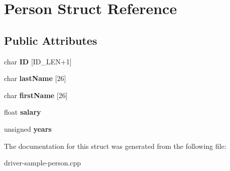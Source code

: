 \hypertarget{struct_person}{\section{Person Struct Reference}
\label{struct_person}
}
\subsection*{Public Attributes}
\begin{DoxyCompactItemize}
\item 
\hypertarget{struct_person_ac13050a60ce356457fa357108931b0d4}{char {\bfseries I\-D} \mbox{[}I\-D\-\_\-\-L\-E\-N+1\mbox{]}}\label{struct_person_ac13050a60ce356457fa357108931b0d4}

\item 
\hypertarget{struct_person_a3c2f907b30cfa4c8e7a4d52602087985}{char {\bfseries last\-Name} \mbox{[}26\mbox{]}}\label{struct_person_a3c2f907b30cfa4c8e7a4d52602087985}

\item 
\hypertarget{struct_person_a818747412f358878f6517472c587e5ac}{char {\bfseries first\-Name} \mbox{[}26\mbox{]}}\label{struct_person_a818747412f358878f6517472c587e5ac}

\item 
\hypertarget{struct_person_ab993b9296f5e833ecd1cfba33666759a}{float {\bfseries salary}}\label{struct_person_ab993b9296f5e833ecd1cfba33666759a}

\item 
\hypertarget{struct_person_a8bd7ca758a3b81e17f56c6fb87804c01}{unsigned {\bfseries years}}\label{struct_person_a8bd7ca758a3b81e17f56c6fb87804c01}

\end{DoxyCompactItemize}


The documentation for this struct was generated from the following file\-:\begin{DoxyCompactItemize}
\item 
driver-\/sample-\/person.\-cpp\end{DoxyCompactItemize}
